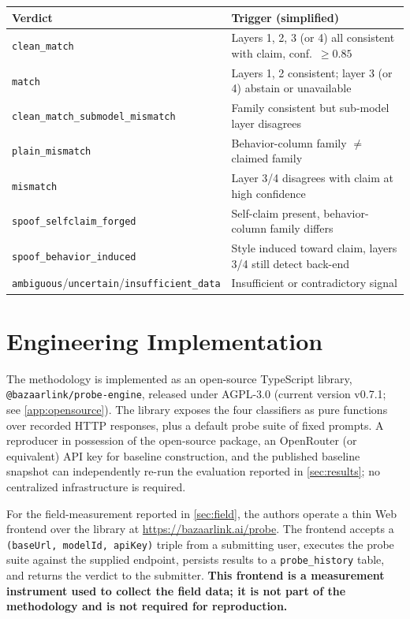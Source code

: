 \documentclass[10pt,a4paper,twocolumn]{article}
\begin{document}
\begin{table}[h]
\centering
\small
\begin{tabularx}{\linewidth}{@{}lX@{}}
\toprule
Verdict & Trigger (simplified) \\
\midrule
\texttt{clean\_match} & Layers 1, 2, 3 (or 4) all consistent with claim, conf.\ $\geq 0.85$ \\
\texttt{match} & Layers 1, 2 consistent; layer 3 (or 4) abstain or unavailable \\
\texttt{clean\_match\_submodel\_mismatch} & Family consistent but sub-model layer disagrees \\
\texttt{plain\_mismatch} & Behavior-column family $\neq$ claimed family \\
\texttt{mismatch} & Layer 3/4 disagrees with claim at high confidence \\
\texttt{spoof\_selfclaim\_forged} & Self-claim present, behavior-column family differs \\
\texttt{spoof\_behavior\_induced} & Style induced toward claim, layers 3/4 still detect back-end \\
\texttt{ambiguous}/\texttt{uncertain}/\texttt{insufficient\_data} & Insufficient or contradictory signal \\
\bottomrule
\end{tabularx}
\end{table}

\section{Engineering Implementation}\label{sec:impl}

The methodology is implemented as an open-source TypeScript library,
\texttt{@bazaarlink/probe-engine}, released under AGPL-3.0 (current version
v0.7.1; see \cref{app:opensource}). The library exposes the four classifiers
as pure functions over recorded HTTP responses, plus a default probe suite of
fixed prompts. A reproducer in possession of the open-source package, an
OpenRouter (or equivalent) API key for baseline construction, and the published
baseline snapshot can independently re-run the evaluation reported in
\cref{sec:results}; no centralized infrastructure is required.

For the field-measurement reported in \cref{sec:field}, the authors operate a
thin Web frontend over the library at \url{https://bazaarlink.ai/probe}. The
frontend accepts a \texttt{(baseUrl, modelId, apiKey)} triple from a submitting
user, executes the probe suite against the supplied endpoint, persists results
to a \texttt{probe\_history} table, and returns the verdict to the submitter.
\textbf{This frontend is a measurement instrument used to collect the field
data; it is not part of the methodology and is not required for reproduction.}
\end{document}
